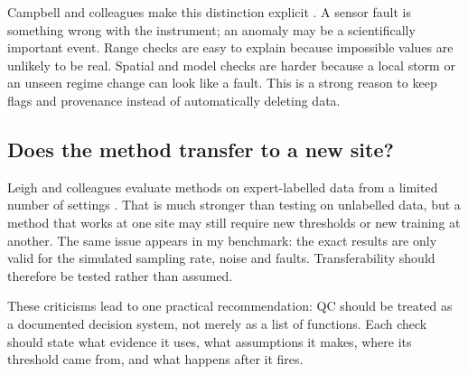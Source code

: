 Campbell and colleagues make this distinction explicit
\citep{campbell2013}. A sensor fault is something wrong with the instrument;
an anomaly may be a scientifically important event. Range checks are easy to
explain because impossible values are unlikely to be real. Spatial and model
checks are harder because a local storm or an unseen regime change can look
like a fault. This is a strong reason to keep flags and provenance instead
of automatically deleting data.

\subsection{Does the method transfer to a new site?}

Leigh and colleagues evaluate methods on expert-labelled data from a limited
number of settings \citep{leigh2019}. That is much stronger than testing on
unlabelled data, but a method that works at one site may still require new
thresholds or new training at another. The same issue appears in my
benchmark: the exact results are only valid for the simulated sampling rate,
noise and faults. Transferability should therefore be tested rather than
assumed.

These criticisms lead to one practical recommendation: QC should be treated
as a documented decision system, not merely as a list of functions. Each
check should state what evidence it uses, what assumptions it makes, where
its threshold came from, and what happens after it fires.


